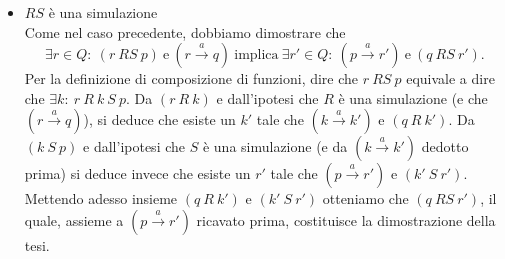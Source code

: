 \begin{itemize}
        \item $RS$ è una simulazione\\
            Come nel caso precedente, dobbiamo dimostrare che
            \begin{equation*}
                \exists r\in Q:\ (r\ RS\ p)\ \mbox{e}\ (r \xrightarrow{a} q)\ \mbox{implica}\ \exists r'\in Q:\ (p \xrightarrow{a} r')\ \mbox{e}\ (q\ RS\ r').
            \end{equation*}
            Per la definizione di composizione di funzioni, dire che $r\ RS\ p$ equivale a dire che $\exists k:\ r\ R\ k\ S\ p$. Da $(r\ R\ k)$ e dall'ipotesi che $R$ è una simulazione (e che $(r \xrightarrow{a} q)$), si deduce che esiste un $k'$ tale che $(k \xrightarrow{a} k')$ e $(q\ R\ k')$. Da $(k\ S\ p)$ e dall'ipotesi che $S$ è una simulazione (e da $(k \xrightarrow{a} k')$ dedotto prima) si deduce invece che esiste un $r'$ tale che $(p \xrightarrow{a} r')$ e $(k'\ S\ r')$.\\
            Mettendo adesso insieme $(q\ R\ k')$ e $(k'\ S\ r')$ otteniamo che $(q\ RS\ r')$, il quale, assieme a $(p \xrightarrow{a} r')$ ricavato prima, costituisce la dimostrazione della tesi.
    \end{itemize}
    